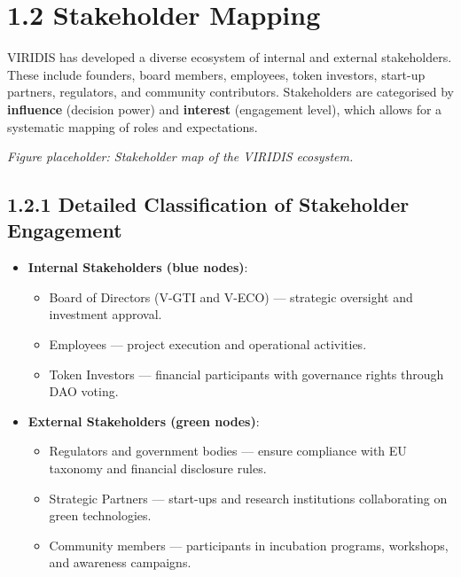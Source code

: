 \documentclass[
  english,
  12pt,
  oneside,
  open=any]{scrbook}
\providecommand{\tightlist}{%
  \setlength{\itemsep}{0pt}\setlength{\parskip}{0pt}}\usepackage{longtable,booktabs,array}
\begin{document}
\section{1.2 Stakeholder Mapping}\label{sec-stakeholders}

VIRIDIS has developed a diverse ecosystem of internal and external
stakeholders. These include founders, board members, employees, token
investors, start-up partners, regulators, and community contributors.
Stakeholders are categorised by \textbf{influence} (decision power) and
\textbf{interest} (engagement level), which allows for a systematic
mapping of roles and expectations.

\emph{Figure placeholder: Stakeholder map of the VIRIDIS ecosystem.}

\subsection{1.2.1 Detailed Classification of Stakeholder
Engagement}\label{sec-stakeholders-class}

\begin{itemize}
\tightlist
\item
  \textbf{Internal Stakeholders (blue nodes)}:

  \begin{itemize}
  \tightlist
  \item
    Board of Directors (V-GTI and V-ECO) --- strategic oversight and
    investment approval.\\
  \item
    Employees --- project execution and operational activities.\\
  \item
    Token Investors --- financial participants with governance rights
    through DAO voting.
  \end{itemize}
\item
  \textbf{External Stakeholders (green nodes)}:

  \begin{itemize}
  \tightlist
  \item
    Regulators and government bodies --- ensure compliance with EU
    taxonomy and financial disclosure rules.\\
  \item
    Strategic Partners --- start-ups and research institutions
    collaborating on green technologies.\\
  \item
    Community members --- participants in incubation programs,
    workshops, and awareness campaigns.
  \end{itemize}
\end{itemize}
\end{document}
